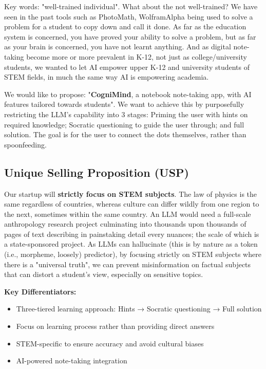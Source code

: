 Key words: "well-trained individual". What about the not well-trained? We have seen in the past tools such as PhotoMath,
WolframAlpha being used to solve a problem for a student to copy down and call it done. As far as the education system
is concerned, you have proved your ability to solve a problem, but as far as your brain is concerned, you have not
learnt anything. And as digital note-taking become more or more prevalent in K-12, not just as college/university
students, we wanted to let AI empower upper K-12 and university students of STEM fields, in much the same way AI is
empowering academia.

We would like to propose: "\textbf{CogniMind}, a notebook note-taking app, with AI features tailored towards students".
We want to achieve this by purposefully restricting the LLM's capability into 3 stages: Priming the user with hints on
required knowledge; Socratic questioning to guide the user through; and full solution. The goal is for the user to
connect the dots themselves, rather than spoonfeeding.

\subsection{Unique Selling Proposition (USP)}
Our startup will \textbf{strictly focus on STEM subjects}. The law of physics is the same regardless of countries,
whereas culture can differ wildly from one region to the next, sometimes within the same country. An LLM would need a
full-scale anthropology research project culminating into thousands upon thousands of pages of text describing in
painstaking detail every nuances; the scale of which is a state-sponsored project. As LLMs can hallucinate (this is by
nature as a token (i.e., morpheme, loosely) predictor), by focusing strictly on STEM subjects where there is a
"universal truth", we can prevent misinformation on factual subjects that can distort a student's view, especially on
sensitive topics.

\textbf{Key Differentiators:}
\begin{itemize}
    \item Three-tiered learning approach: Hints → Socratic questioning → Full solution
    \item Focus on learning process rather than providing direct answers
    \item STEM-specific to ensure accuracy and avoid cultural biases
    \item AI-powered note-taking integration
\end{itemize}

